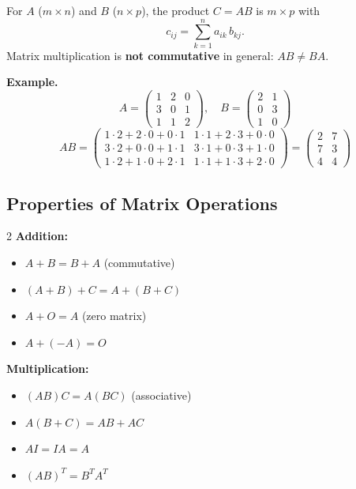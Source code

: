 \documentclass[12pt]{article}
\begin{document}
\begin{defbox}
For $A$ ($m\times n$) and $B$ ($n\times p$), the product $C = AB$ is $m\times p$ with
\[
c_{ij} = \sum_{k=1}^{n} a_{ik}\,b_{kj}.
\]
Matrix multiplication is \textbf{not commutative} in general: $AB \neq BA$.
\end{defbox}

\textbf{Example.}
\[
A = \begin{pmatrix}1&2&0\\3&0&1\\1&1&2\end{pmatrix}, \quad
B = \begin{pmatrix}2&1\\0&3\\1&0\end{pmatrix}
\]
\[
AB = \begin{pmatrix}1\cdot2+2\cdot0+0\cdot1 & 1\cdot1+2\cdot3+0\cdot0 \\ 3\cdot2+0\cdot0+1\cdot1 & 3\cdot1+0\cdot3+1\cdot0 \\ 1\cdot2+1\cdot0+2\cdot1 & 1\cdot1+1\cdot3+2\cdot0\end{pmatrix}
= \begin{pmatrix}2&7\\7&3\\4&4\end{pmatrix}
\]

\subsection{Properties of Matrix Operations}

\begin{tcolorbox}[enhanced, colback=greenbg, colframe=greenclr, arc=4pt, boxrule=1pt]
\begin{multicols}{2}
\textbf{Addition:}
\begin{itemize}[leftmargin=14pt, itemsep=2pt]
  \item $A+B = B+A$ (commutative)
  \item $(A+B)+C = A+(B+C)$
  \item $A + O = A$ (zero matrix)
  \item $A + (-A) = O$
\end{itemize}
\columnbreak
\textbf{Multiplication:}
\begin{itemize}[leftmargin=14pt, itemsep=2pt]
  \item $(AB)C = A(BC)$ (associative)
  \item $A(B+C) = AB+AC$
  \item $AI = IA = A$
  \item $(AB)^T = B^T A^T$
\end{itemize}
\end{multicols}
\end{tcolorbox}
\end{document}
